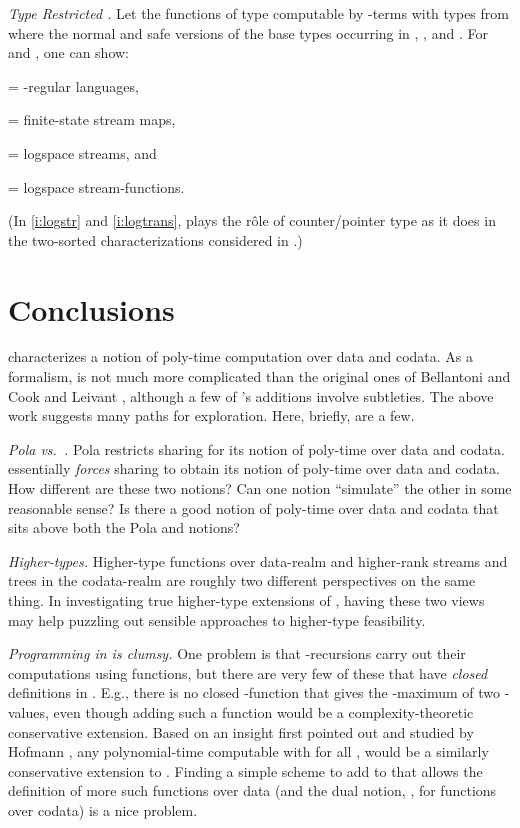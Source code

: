 \documentclass[envcountsame]{llncs}
\begin{document}
\emph{Type Restricted  .} 
Let  the functions of type
 computable by -terms with types from
 where  the normal and safe versions of the base 
types occurring in , , and .
For
 and 
,
one can show:
\begin{inparaenum}[\it (i)]
  \item 
 =
  	-regular languages,
  \item 
 =
  	finite-state stream maps,
  \item \label{i:logstr}
 =
    logspace streams, and
  \item \label{i:logtrans}
 =
    logspace stream-functions.
\end{inparaenum}
(In \eqref{i:logstr} and \eqref{i:logtrans},  plays the
r\^{o}le of counter/pointer type as it does in the two-sorted
characterizations considered in \cite{CookNguyen:book}.)




\section{Conclusions}\label{S:fini}

 characterizes a notion of poly-time computation over data 
and codata. As a formalism,  is not much more complicated  
than  the original ones of Bellantoni and Cook
\cite{BellantoniCook} and Leivant \cite{Leivant:FM2}, although
a few of  's additions involve  subtleties.  
The above work suggests many paths for exploration.
Here, briefly, are a few.



\emph{Pola vs.~.}
Pola restricts sharing for its notion of poly-time
over data and codata.  essentially \emph{forces} sharing 
to obtain its notion of poly-time over data and codata. 
How different are these two notions?  Can one notion
``simulate'' the other in some reasonable sense?  Is there
a good notion of poly-time over data and codata that sits above
both the Pola and  notions?


\emph{Higher-types.} Higher-type functions over data-realm and higher-rank streams and
trees in the codata-realm are roughly two different perspectives 
on the same thing.  In investigating true higher-type
extensions of , having these two views may help puzzling out
sensible approaches to higher-type feasibility. 



\emph{Programming in  is clumsy.}  
One problem is that  -recursions carry out their computations 
using  functions, but there are very few
of these that have \emph{closed} definitions in . E.g.,
there is no closed -function that gives the
-maximum of two -values, even though adding
such a function would be a complexity-theoretic conservative 
extension.
Based on an insight first pointed out and studied by
Hofmann \cite{Hofmann03}, any polynomial-time computable
 with  for all , would be a similarly conservative extension to
.  Finding a simple scheme to add to  that allows the definition
of more such functions over data (and the dual notion,
, for functions over codata) is a nice
problem.
\end{document}
